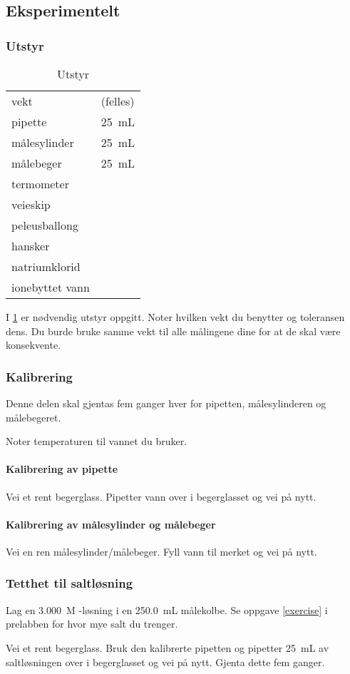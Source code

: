 	\subsection{Eksperimentelt}
	
	\subsubsection{Utstyr}
	
	\begin{table}[H]
		\caption{Utstyr}
		\begin{tabular}{ll}
			\toprule
			vekt & (felles) \\
			pipette & \SI{25}{mL} \\
			målesylinder & \SI{25}{mL} \\
			målebeger & \SI{25}{mL} \\
			termometer & \\
			veieskip & \\
			peleusballong & \\
			hansker & \\
			natriumklorid & \\
			ionebyttet vann & \\ \bottomrule 
		\end{tabular}
		\label{equipment}
	\end{table}
	
	I \cref{equipment} er nødvendig utstyr oppgitt.	Noter hvilken vekt du benytter og toleransen dens. Du burde bruke samme vekt til alle målingene dine for at de skal være konsekvente.
	
	\subsubsection{Kalibrering}
	
	Denne delen skal gjentas fem ganger hver for pipetten, målesylinderen og målebegeret. 
	
	Noter temperaturen til vannet du bruker. 
	
	\paragraph{Kalibrering av pipette}
	Vei et rent begerglass. Pipetter vann over i begerglasset og vei på nytt.
	
	\paragraph{Kalibrering av målesylinder og målebeger}
	Vei en ren målesylinder/målebeger. Fyll vann til merket og vei på nytt.
	
	\subsubsection{Tetthet til saltløsning}
	Lag en \SI{3.000}{M} -løsning i en \SI{250.0}{mL} målekolbe. Se oppgave \ref{exercise} i prelabben for hvor mye salt du trenger. 
	
	Vei et rent begerglass. Bruk den kalibrerte pipetten og pipetter \SI{25}{mL} av saltløsningen over i begerglasset og vei på nytt. Gjenta dette fem ganger.
	
	
	
